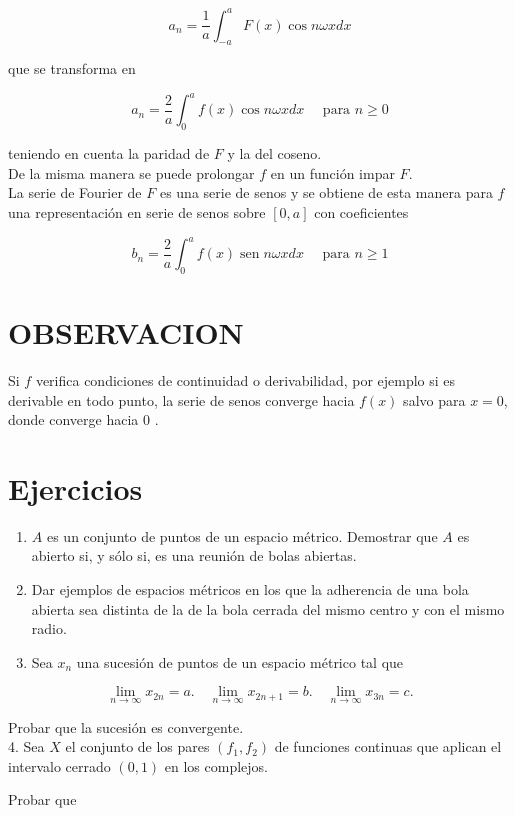 \documentclass[10pt]{article}
\theoremstyle{plain}
\theoremstyle{definition}
\theoremstyle{remark}
\begin{document}
$$
a_{n}=\frac{1}{a} \int_{-a}^{a} F(x) \cos n \omega x d x
$$

que se transforma en

$$
a_{n}=\frac{2}{a} \int_{0}^{a} f(x) \cos n \omega x d x \quad \text { para } n \geqslant 0
$$

teniendo en cuenta la paridad de $F$ y la del coseno.\\
De la misma manera se puede prolongar $f$ en un función impar $F$.\\
La serie de Fourier de $F$ es una serie de senos y se obtiene de esta manera para $f$ una representación en serie de senos sobre $[0, a]$ con coeficientes

$$
b_{n}=\frac{2}{a} \int_{0}^{a} f(x) \operatorname{sen} n \omega x d x \quad \text { para } n \geqslant 1
$$

\section*{OBSERVACION}
Si $f$ verifica condiciones de continuidad o derivabilidad, por ejemplo si es derivable en todo punto, la serie de senos converge hacia $f(x)$ salvo para $x=0$, donde converge hacia 0 .

\section*{Ejercicios}
\begin{enumerate}
  \item $A$ es un conjunto de puntos de un espacio métrico. Demostrar que $A$ es abierto si, y sólo si, es una reunión de bolas abiertas.
  \item Dar ejemplos de espacios métricos en los que la adherencia de una bola abierta sea distinta de la de la bola cerrada del mismo centro y con el mismo radio.
  \item Sea $x_{n}$ una sucesión de puntos de un espacio métrico tal que
\end{enumerate}

$$
\lim _{n \rightarrow \infty} x_{2 n}=a . \quad \lim _{n \rightarrow \infty} x_{2 n+1}=b . \quad \lim _{n \rightarrow \infty} x_{3 n}=c .
$$

Probar que la sucesión es convergente.\\
4. Sea $X$ el conjunto de los pares $\left(f_{1}, f_{2}\right)$ de funciones continuas que aplican el intervalo cerrado $(0,1)$ en los complejos.

Probar que
\end{document}
